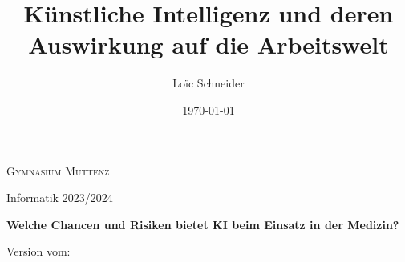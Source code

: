 \documentclass{report}
\title{Künstliche Intelligenz und deren Auswirkung auf die Arbeitswelt}
\author{Loïc Schneider}
\date{\today}
\begin{document}
\begin{titlepage}
    \makeatletter %
	\begin{center}
		{\scshape Gymnasium Muttenz} \vspace{0.5cm}

		 Informatik 2023/2024\vspace{5.5cm}

		{\huge\bfseries \@title} 

        \vspace{1cm}

        {\Large\bfseries Welche Chancen und Risiken bietet KI beim Einsatz in der Medizin?}

        \vspace{2cm}

		\vspace{2cm}

		{\Large\itshape \@author}

        \vspace{2cm}

        Version vom: \@date
	\end{center}
    
    \makeatother %
\end{titlepage}

\tableofcontents












\nocite{*}

\printbibliography
\end{document}
